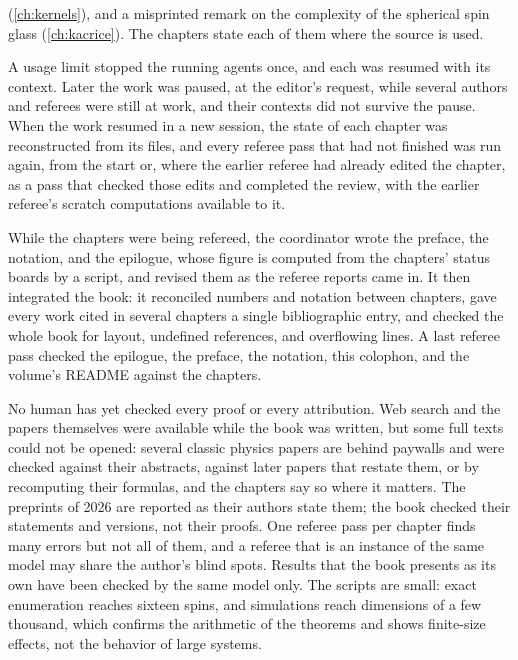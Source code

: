 (\cref{ch:kernels}), and a misprinted remark on the complexity of the spherical spin glass (\cref{ch:kacrice}). The chapters state each of them where the source is used.

A usage limit stopped the running agents once, and each was resumed with its context. Later the work was paused, at the editor's request, while several authors and referees were still at work, and their contexts did not survive the pause. When the work resumed in a new session, the state of each chapter was reconstructed from its files, and every referee pass that had not finished was run again, from the start or, where the earlier referee had already edited the chapter, as a pass that checked those edits and completed the review, with the earlier referee's scratch computations available to it.

While the chapters were being refereed, the coordinator wrote the preface, the notation, and the epilogue, whose figure is computed from the chapters' status boards by a script, and revised them as the referee reports came in. It then integrated the book: it reconciled numbers and notation between chapters, gave every work cited in several chapters a single bibliographic entry, and checked the whole book for layout, undefined references, and overflowing lines. A last referee pass checked the epilogue, the preface, the notation, this colophon, and the volume's README against the chapters.


No human has yet checked every proof or every attribution. Web search and the papers themselves were available while the book was written, but some full texts could not be opened: several classic physics papers are behind paywalls and were checked against their abstracts, against later papers that restate them, or by recomputing their formulas, and the chapters say so where it matters. The preprints of 2026 are reported as their authors state them; the book checked their statements and versions, not their proofs. One referee pass per chapter finds many errors but not all of them, and a referee that is an instance of the same model may share the author's blind spots. Results that the book presents as its own have been checked by the same model only. The scripts are small: exact enumeration reaches sixteen spins, and simulations reach dimensions of a few thousand, which confirms the arithmetic of the theorems and shows finite-size effects, not the behavior of large systems.


